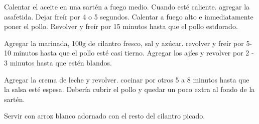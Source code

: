 \begin{recipe}
{        \step Calentar el aceite en una sart\'en a fuego medio. Cuando est\'e caliente. agregar la asafetida. Dejar fre\'ir por 4 o 5 segundos. Calentar a fuego alto e inmediatamente poner el pollo. Revolver y fre\'ir por 15 minutos hasta que el pollo est\' dorado.
        
        \step Agregar la marinada, 100g de cilantro fresco, sal y az\'ucar. revolver y fre\'ir por 5-10 minutos hasta que el pollo est\'e casi tierno. Agregar los aj\'ies y revolver por 2 - 3 minutos hasta que est\'en blandos. 
        
        \step Agregar la crema de leche y revolver. cocinar por otros 5 a 8 minutos hasta que la salsa est\'e espesa. Deber\'ia cubrir el pollo y quedar un poco extra al fondo de la sart\'en.   
        
        \step Servir con arroz blanco adornado con el resto del cilantro picado.
    }
    
    
    
    \hint{%

    }
    
\end{recipe}